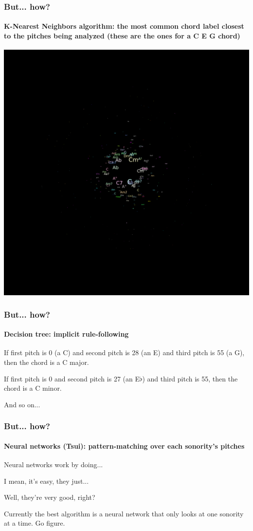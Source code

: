 \documentclass{beamer}
\begin{document}
\begin{frame}
  \frametitle{But... how?}
  \framesubtitle{K-Nearest Neighbors algorithm: the most common chord
    label closest to the pitches being analyzed (these are the ones for a C E G chord)}
  \addvspace{0.5em}
  \includegraphics[scale=0.3, trim = 50em 0em 0em 51em, clip]{figs/knn}
\end{frame}

\begin{frame}
  \frametitle{But... how?}
  \framesubtitle{Decision tree: implicit rule-following}
    \begin{large}
      If first pitch is 0 (a C) and second pitch is 28 (an E) and third pitch is
      55 (a G), then the chord is a C
      major.

      \addvspace{1em}

      If first pitch is 0 and second pitch is 27 (an E$\flat$) and third pitch is
      55, then the chord is a C
      minor.
    \end{large}
  \begin{center}

    \addvspace{3em}

    And so on...%
  \end{center}
\end{frame}


\begin{frame}
  \frametitle{But... how?}
  \framesubtitle{Neural networks (Tsui): pattern-matching over each sonority's
  pitches}

Neural networks work by doing...

I mean, it's easy, they just...

Well, they're very good, right?

\addvspace{2em}
\begin{small}
  Currently the best algorithm is a neural network that only looks at
  one sonority at a time. Go figure.
\end{small}
\end{frame}
\end{document}
